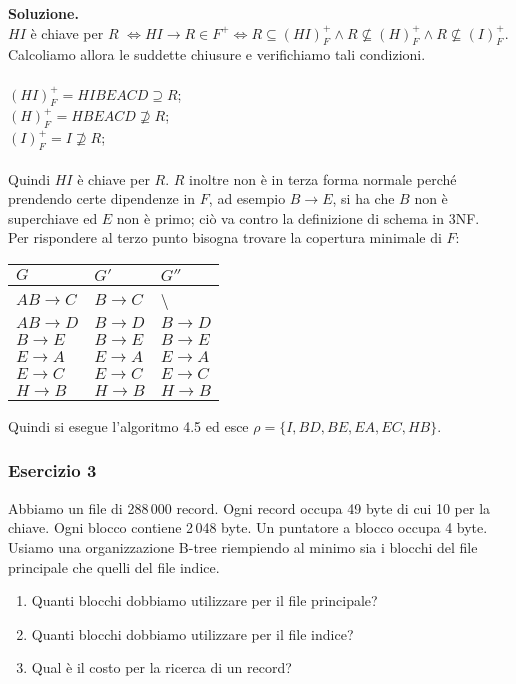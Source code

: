  \noindent\textbf{\fontsize{14pt}{1em}Soluzione.}\\
 $HI$ è chiave per $R$ $\Leftrightarrow HI \rightarrow R\in F^+ \Leftrightarrow R \subseteq (HI)^+_F \wedge
 R \not\subseteq (H)^+_F \wedge R \not\subseteq (I)^+_F$. Calcoliamo allora le suddette chiusure 
 e verifichiamo tali condizioni.\\\\
 $(HI)^+_F = HIBEACD \supseteq R$;\\
 $(H)^+_F = HBEACD \not\supseteq R$;\\
 $(I)^+_F = I \not\supseteq R$;\\\\
Quindi $HI$ è chiave per $R$. $R$ inoltre non è in terza forma normale perché prendendo certe dipendenze in $F$, ad esempio 
$B \rightarrow E$, si ha che $B$ non è superchiave ed $E$ non è primo; ciò va contro la definizione di schema in 3NF.\\
Per rispondere al terzo punto bisogna trovare la copertura minimale di $F$:
\begin{center}
 \begin{tabular}{l|l|l}
  $G$ & $G'$ & $G''$\\
  \hline
  $AB\rightarrow C$ & $B\rightarrow C$ & \textbackslash \\
  $AB \rightarrow D$ & $B \rightarrow D$ & $B \rightarrow D$\\
  $B \rightarrow E$ & $B \rightarrow E$ & $B \rightarrow E$\\ 
  $E \rightarrow A$ & $E \rightarrow A$ & $E \rightarrow A$\\
  $E \rightarrow C$ & $E \rightarrow C$ & $E \rightarrow C$\\
  $H \rightarrow B$ & $H \rightarrow B$ & $H \rightarrow B$\\ 
 \end{tabular}
\end{center}
Quindi si esegue l'algoritmo 4.5 ed esce $\rho= \{I, BD, BE, EA, EC, HB\}$.

\subsubsection{Esercizio 3}
Abbiamo un file di 288\,000 record. Ogni record occupa 49 byte di cui 10 per la chiave. Ogni blocco contiene 2\,048 byte. 
Un puntatore a blocco occupa 4 byte. Usiamo una organizzazione B-tree riempiendo al minimo sia i blocchi del file 
principale che quelli del file indice.
\begin{enumerate}
 \item Quanti blocchi dobbiamo utilizzare per il file principale? 
 \item Quanti blocchi dobbiamo utilizzare per il file indice?
 \item Qual è il costo per la ricerca di un record? 
\end{enumerate}

